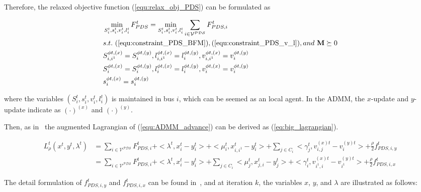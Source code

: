 \documentclass[final]{IEEEtran}
\begin{document}
Therefore, the relaxed objective function (\ref{equ:relax_obj_PDS}) can be formulated as 

\begin{subequations}\label{equ:ADMM_advance}
	\begin{align} 
	& \min_{S^t_i, s^t_i, v^t_i, l^t_i} F^t_{PDS} = \min_{S^t_i, s^t_i, v^t_i, l^t_i} \sum_{i \in \mathcal{V^{PDS}}} F^t_{PDS,i} \label{equ: ADMM_ad1}\\
	& s.t. \ (\ref{equ:constraint_PDS_BFM}), (\ref{equ:constraint_PDS_v_l}), and\  \mathbf{M}\succeq0 \label{equ: ADMM_ad2}\\
	& S^{\phi t,(x)}_{i,i^1} = S^{\phi t,(y)}_{i}, l^{\phi t,(x)}_{i,i^1} = l^{\phi t,(y)}_{i}, v^{\phi t,(x)}_{i,i^1} = v^{\phi t,(y)}_{i} \label{equ: ADMM_ad3}\\
	& S^{\phi t,(x)}_{i} = S^{\phi t,(y)}_{i},  l^{\phi t,(x)}_{i} = l^{\phi t,(y)}_{i},  v^{\phi t,(x)}_{i} = v^{\phi t,(y)}_{i} \label{equ: ADMM_ad4}\\ 
	& s^{\phi t,(x)}_{i} = s^{\phi t,(y)}_{i} \label{equ: ADMM_ad5}
	\end{align}
\end{subequations}

where the variables $(S^t_i, s^t_i, v^t_i, l^t_i)$ is maintained in bus $i$, which can be seemed as an local agent. In the ADMM, the $x$-update and $y$-update indicate as $( \cdot )^{(x)}$ and $( \cdot )^{(y)}$.

Then, as in~\cite{pe015dis456ed,boyd2011d45istributed} the augmented Lagrangian of (\ref{equ:ADMM_advance}) can be derived as (\ref{eq:big_lagrangian}).

\begin{figure*}[!t]
	\begin{subequations}\label{eq:big_lagrangian}
		\begin{align}
		L^t_{\rho}(x^t,y^t,\lambda^t)	
		& = \sum_{i \in \mathcal{V^{PDS}}}F^t_{PDS,i} + <\lambda^t, x^t_i-y^t_i> + <\mu^t_i, x^t_{i,i^1} - y^t_i> + \sum_{j \in C_i}<\gamma^t_j, v^{(x)t}_{i,j} - v^{(y)t}_i> + \frac{\rho}{2} f^t_{PDS,i,y}\\
		& = \sum_{i \in \mathcal{V^{PDS}}}F^t_{PDS,i} + <\lambda^t, x^t_i-y^t_i> + \sum_{j \in C_i} <\mu^t_j, x^t_{j,i} - y^t_j> + <\gamma^t_i, v^{(x)t}_{i^1,i} - v^{(y)t}_{i^1}> + \frac{\rho}{2} f^t_{PDS,i,x}
		\end{align}
	\end{subequations}
	\vspace*{0.0in}
\end{figure*}
The detail formulation of $f^t_{PDS,i,y}$ and $f^t_{PDS,i,x}$ can be found in~\cite{pe015dis456ed}, and at iteration $k$, the variables $x$, $y$, and $\lambda$ are illustrated as follows:
\end{document}
